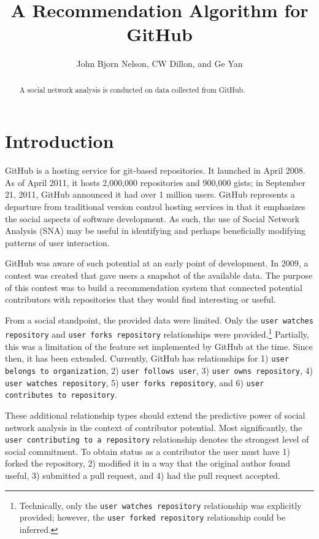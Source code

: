 \documentclass{article}
\title{A Recommendation Algorithm for GitHub}
\author{John Bjorn Nelson, CW Dillon, and Ge Yan}
\begin{document}
  \maketitle
  
  \begin{abstract}
    A social network analysis is conducted on data collected from GitHub.
  \end{abstract}

  \section{Introduction}
  
  GitHub is a hosting service for git-based repositories. It launched in April 2008\cite{githublaunch}. As of April 2011, it hosts 2,000,000 repositories and 900,000 gists;\cite{githubnumbers} in September 21, 2011, GitHub announced it had over 1 million users.\cite{githubmillion} GitHub represents a departure from traditional version control hosting services in that it emphasizes the social aspects of software development. As such, the use of Social Network Analysis (SNA) may be useful in identifying and perhaps beneficially modifying patterns of user interaction.
  
  GitHub was aware of such potential at an early point of development. In 2009, a contest was created that gave users a snapshot of the available data.\cite{githubcontest} The purpose of this contest was to build a recommendation system that connected potential contributors with repositories that they would find interesting or useful. 
  
  From a social standpoint, the provided data were limited. Only the {\tt user watches repository} and {\tt user forks repository} relationships were provided.\footnote{Technically, only the {\tt user watches repository} relationship was explicitly provided; however, the {\tt user forked repository} relationship could be inferred.} Partially, this was a limitation of the feature set implemented by GitHub at the time. Since then, it has been extended. Currently, GitHub has relationships for 1) {\tt user belongs to organization}, 2) {\tt user follows user}, 3) {\tt user owns repository}, 4) {\tt user watches repository}, 5) {\tt user forks repository}, and 6) {\tt user contributes to repository}. 
  
  These additional relationship types should extend the predictive power of social network analysis in the context of contributor potential. Most significantly, the {\tt user contributing to a repository} relationship denotes the strongest level of social commitment. To obtain status as a contributor the user must have 1) forked the repository, 2) modified it in a way that the original author found useful, 3) submitted a pull request, and 4) had the pull request accepted. 
  
\end{document}
